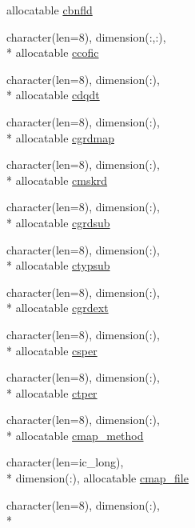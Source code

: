 \begin{DoxyCompactItemize}
allocatable \hyperlink{classmod__oasis__namcouple_af5bfb0fe58a77461130b9967fa7a4d5e}{cbnfld}
\item 
character(len=8), dimension(\+:,\+:), \\*
allocatable \hyperlink{classmod__oasis__namcouple_a009543dda4495ab9b5ac3fcf15767682}{ccofic}
\item 
character(len=8), dimension(\+:), \\*
allocatable \hyperlink{classmod__oasis__namcouple_a9c5a3b3a864f3feb95eddc08616b998e}{cdqdt}
\item 
character(len=8), dimension(\+:), \\*
allocatable \hyperlink{classmod__oasis__namcouple_affa01947af89e5cdad5f33fba2a53d22}{cgrdmap}
\item 
character(len=8), dimension(\+:), \\*
allocatable \hyperlink{classmod__oasis__namcouple_a28c3f9e076a686c8ef916221e8fe4e10}{cmskrd}
\item 
character(len=8), dimension(\+:), \\*
allocatable \hyperlink{classmod__oasis__namcouple_ac7f3cff3406912fe6e48c3cc7cf5436b}{cgrdsub}
\item 
character(len=8), dimension(\+:), \\*
allocatable \hyperlink{classmod__oasis__namcouple_ad8f8aca3a6fa885e4edf027b79a93305}{ctypsub}
\item 
character(len=8), dimension(\+:), \\*
allocatable \hyperlink{classmod__oasis__namcouple_a5db101d0bffaf6fbd5ae10d1d0069108}{cgrdext}
\item 
character(len=8), dimension(\+:), \\*
allocatable \hyperlink{classmod__oasis__namcouple_a348612422a03e478041ca5bdfd7201ae}{csper}
\item 
character(len=8), dimension(\+:), \\*
allocatable \hyperlink{classmod__oasis__namcouple_aa179b0a473551b48ef895497515d021c}{ctper}
\item 
character(len=8), dimension(\+:), \\*
allocatable \hyperlink{classmod__oasis__namcouple_ac8c1f0014f2c3cbe0cc4fcb09e54dde3}{cmap\+\_\+method}
\item 
character(len=ic\+\_\+long), \\*
dimension(\+:), allocatable \hyperlink{classmod__oasis__namcouple_a6dbd7bccbfa28b209a4bc58131f8cf11}{cmap\+\_\+file}
\item 
character(len=8), dimension(\+:), \\*

\end{DoxyCompactItemize}
